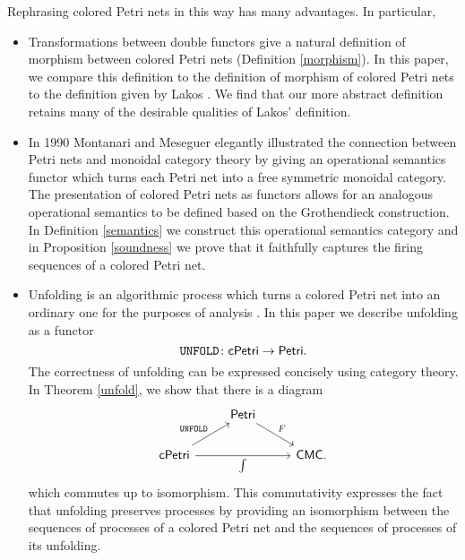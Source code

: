 Rephrasing colored Petri nets in this way has many advantages. In particular,
\begin{itemize}
    \item Transformations between double functors give a natural definition of morphism between colored Petri nets (Definition \ref{morphism}). In this paper, we compare this definition to the definition of morphism of colored Petri nets to the definition given by Lakos \cite{lakosabstraction, lakoscomposing}. We find that our more abstract definition retains many of the desirable qualities of Lakos' definition.
 \item In 1990 \cite{monoids} Montanari and Meseguer elegantly illustrated the connection between Petri nets and monoidal category theory by giving an operational semantics functor which turns each Petri net into a free symmetric monoidal category. The presentation of colored Petri nets as functors allows for an analogous operational semantics to be defined based on the Grothendieck construction. In Definition \ref{semantics} we construct this operational semantics category and in Proposition \ref{soundness} we prove that it faithfully captures the firing sequences of a colored Petri net.
\item Unfolding is an algorithmic process which turns a colored Petri net into an ordinary one for the purposes of analysis \cite{jensen2013coloured}. In this paper we describe unfolding as a functor 
    \[ \mathtt{UNFOLD} \colon \mathsf{cPetri} \to \mathsf{Petri}.\]
    The correctness of unfolding can be expressed concisely using category theory. In Theorem \ref{unfold}, we show that there is a diagram
\[
\begin{tikzcd} 
& \Petri \ar[dr,"F"] & \\
\cPetri \ar[ur,"\UNFOLD"] \ar[rr,"\int",swap]  & &\CMC.
\end{tikzcd}
\]
which commutes up to isomorphism. This commutativity expresses the fact that unfolding preserves processes by providing an isomorphism between the sequences of processes of a colored Petri net and the sequences of processes of its unfolding.
\end{itemize}

